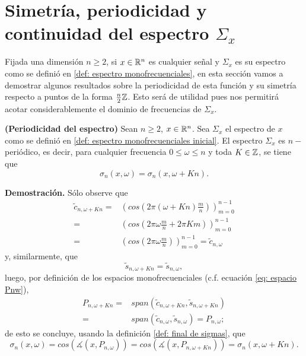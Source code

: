 \section{Simetría, periodicidad y continuidad del espectro $\Sigma_{x}$}
\label{sec: simetria, periodicidad, continuidad}
Fijada una dimensión $n \geq 2$,
si $x \in \mathbb{R}^{n}$ es cualquier señal y 
$\Sigma_{x}$
es su espectro como se definió en
\ref{def: espectro monofrecuenciales},
en esta sección vamos a demostrar 
algunos resultados sobre la periodicidad 
de esta función y su simetría 
respecto a puntos de la forma
$\frac{n}{2} \mathbb{Z}$.
Esto será de utilidad pues nos permitirá
acotar considerablemente el dominio de frecuencias
de $\Sigma_{x}$.



\begin{prop}
\label{prop: periodicidad espectro}
\textbf{(Periodicidad del espectro)}
Sean $n \geq 2$, $x \in \mathbb{R}^{n}$.
Sea $\Sigma_{x}$ el espectro de $x$ como se definió en 
\eqref{def: espectro monofrecuenciales inicial}.
El espectro $\Sigma_{x}$ es $n-$periódico, es decir, 
para cualquier frecuencia
$0 \leq \omega \leq n$
y toda $K \in \mathbb{Z}$, se tiene que 
\[
\sigma_{n}(x, \omega) = \sigma_{n}(x, \omega + Kn).
\]
\end{prop}
\noindent
\textbf{Demostración.}
Sólo observe que 
\begin{align*}
\tilde{c}_{n, \omega + Kn} = & \left( cos \left( 2 \pi
\left( \omega + Kn \right) \frac{m}{n} \right) \right)_{m=0}^{n-1} \\
= & \left( cos \left( 
2 \pi \omega \frac{m}{n} + 2 \pi K m
\right) \right)_{m=0}^{n-1} \\
= & \left( cos \left( 
2 \pi \omega \frac{m}{n}
\right) \right)_{m=0}^{n-1} = \tilde{c}_{n, \omega}
\end{align*}
y, similarmente, que 
\[
\tilde{s}_{n, \omega + Kn} = \tilde{s}_{n, \omega},
\]
luego, por definición de los espacios monofrecuenciales
(c.f. ecuación \ref{eq: espacio Pnw}),
\begin{align*}
P_{n, \omega + Kn} =
& span(\tilde{c}_{n, \omega + Kn}, \tilde{s}_{n, \omega + Kn}) \\
= & span(\tilde{c}_{n, \omega }, \tilde{s}_{n, \omega }) = P_{n, \omega};
\end{align*}
de esto se concluye, usando la definición
\ref{def: final de sigmas},
que 
\[
\sigma_{n}(x, \omega) = 
cos (\measuredangle(x, P_{n, \omega}))
= cos (\measuredangle(x, P_{n, \omega + Kn})) = 
\sigma_{n}(x, \omega + Kn).
\]
\QEDB
\vspace{0.2cm}

